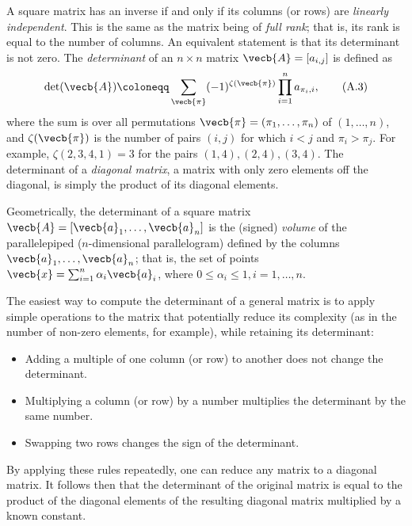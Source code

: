 A square matrix has an inverse if and only if its columns (or rows) are \textit{linearly independent}. This is the same as the matrix being of \textit{full rank}; that is, its rank is equal to the number of columns. An equivalent statement is that its determinant is not zero. The \textit{determinant} of an $n \times n$ matrix $\vecb{A} = [a_{i,j}]$ is defined as
\begin{equation}
	\det(\vecb{A}) \coloneqq \sum_{\vecb{\pi}} (-1)^{\zeta(\vecb{\pi})} \prod_{i=1}^n a_{\pi_i, i}, \tag{A.3}
\end{equation}
where the sum is over all permutations $\vecb{\pi} = (\pi_1, \dots, \pi_n)$ of $(1, \dots, n)$, and $\zeta(\vecb{\pi})$ is the number of pairs $(i, j)$ for which $i < j$ and $\pi_i > \pi_j$. For example, $\zeta(2, 3, 4, 1) = 3$ for the pairs $(1, 4), (2, 4), (3, 4)$. The determinant of a \textit{diagonal matrix}, a matrix with only zero elements off the diagonal, is simply the product of its diagonal elements.

Geometrically, the determinant of a square matrix $\vecb{A} = [\vecb{a}_1, \dots, \vecb{a}_n]$ is the (signed) \textit{volume} of the parallelepiped ($n$-dimensional parallelogram) defined by the columns $\vecb{a}_1, \dots, \vecb{a}_n$; that is, the set of points $\vecb{x} = \sum_{i=1}^n \alpha_i \vecb{a}_i$, where $0 \le \alpha_i \le 1, i = 1, \dots, n$.

The easiest way to compute the determinant of a general matrix is to apply simple operations to the matrix that potentially reduce its complexity (as in the number of non-zero elements, for example), while retaining its determinant:

\begin{itemize}
	\item Adding a multiple of one column (or row) to another does not change the determinant.
	\item Multiplying a column (or row) by a number multiplies the determinant by the same number.
	\item Swapping two rows changes the sign of the determinant.
\end{itemize}

By applying these rules repeatedly, one can reduce any matrix to a diagonal matrix. It follows then that the determinant of the original matrix is equal to the product of the diagonal elements of the resulting diagonal matrix multiplied by a known constant.

